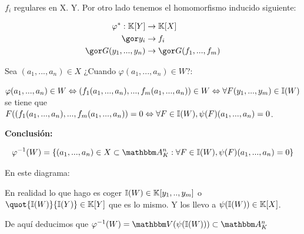 $f_i$ regulares en X.
Y. Por otro lado tenemos el homomorfismo inducido siguiente:

\begin{align*}
\varphi^*: \K[Y] & \rightarrow \K[X] \\
\cls{y_i} & \rightarrow f_i\\
\cls{G(y_1,...,y_n)} & \rightarrow \cls{G(f_1,...,f_m)}
\end{align*}

Sea $(a_1,...,a_n) \in X$ ¿Cuando $\varphi(a_1,...,a_n) \in W$?:

$\varphi(a_1,...,a_n) \in W \Leftrightarrow (f_1(a_1,...,a_n),...,f_m(a_1,...,a_n)) \in W \Leftrightarrow \forall F(y_1,...,y_m) \in \mathbb{I}(W)$ se tiene que $F((f_1(a_1,...,a_n),...,f_m(a_1,...,a_n))=0 \Leftrightarrow \forall F \in \mathbb{I}(W), \psi(F)(a_1,...,a_n)=0$.

\textbf{Conclusión:}

$$ \varphi^{-1}(W)=\left\{ (a_1,...,a_n) \in X \subset \Akn: \forall F \in \I(W), \psi(F)(a_1,...,a_n)=0 \right\} $$

En este diagrama:



En realidad lo que hago es coger $\mathbb{I}(W) \in \mathbb{K}[y_1,..,y_m]$ o $\quot{\I(W)}{\I(Y)} \in \K[Y]$ que es lo mismo. Y los llevo a $\psi(\mathbb{I}(W)) \in \mathbb{K}[X]$.

De aquí deducimos que $\varphi^{-1}(W)=\V(\psi(\I(W))) \subset \Akn$

